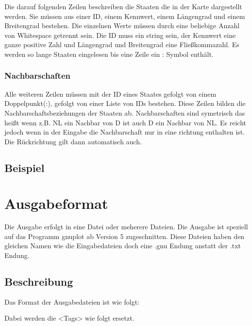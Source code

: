 Die darauf folgenden Zeilen beschreiben die Staaten die in der Karte dargestellt werden.
Sie müssen aus einer ID, einem Kennwert, einem Längengrad und einem Breitengrad bestehen. Die einzelnen Werte müssen durch eine beliebige Anzahl von Whitespace getrennt sein.
Die ID muss ein string sein, der Kennwert eine ganze positive Zahl und Längengrad und Breitengrad eine Fließkommazahl.
Es werden so lange Staaten eingelesen bis eine Zeile ein : Symbol enthält.

\subsubsection{Nachbarschaften}

Alle weiteren Zeilen müssen mit der ID eines Staates gefolgt von einem Doppelpunkt(:), gefolgt von einer Liste von IDs bestehen.
Diese Zeilen bilden die Nachbarschaftsbeziehungen der Staaten ab.
Nachbarschaften sind symetrisch das heißt wenn z.B. NL ein Nachbar von D ist auch D ein Nachbar von NL.
Es reicht jedoch wenn in der Eingabe die Nachbarschaft nur in eine richtung enthalten ist. Die Rückrichtung gilt dann automatisch auch.

\subsection{Beispiel}



\section{Ausgabeformat}
Die Ausgabe erfolgt in eine Datei oder meherere Dateien. Die Ausgabe ist speziell auf das Programm gnuplot ab Version 5 zugeschnitten.
Diese Dateien haben den gleichen Namen wie die Eingabedateien doch eine .gnu Endung anstatt der .txt Endung.

\subsection{Beschreibung}
Das Format der Ausgabedateien ist wie folgt:



Dabei werden die <Tags> wie folgt ersetzt.



